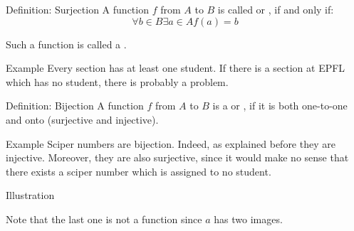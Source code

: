 \documentclass[a4paper]{article}
\begin{document}
\begin{parag}{Definition: Surjection}
    A function $f$ from $A$ to $B$ is called  or , if and only if:
    \[\forall b \in B \exists a \in A f\left(a\right) = b\]

    Such a function is called a .

    \begin{subparag}{Example}
        Every section has at least one student. If there is a section at EPFL which has no student, there is probably a problem.
    \end{subparag}
\end{parag}


\begin{parag}{Definition: Bijection}
    A function $f$ from $A$ to $B$ is a  or , if it is both one-to-one and onto (surjective and injective).

    \begin{subparag}{Example}
        Sciper numbers are bijection. Indeed, as explained before they are injective. Moreover, they are also surjective, since it would make no sense that there exists a sciper number which is assigned to no student.
    \end{subparag}
\end{parag}

\begin{parag}{Illustration}

    Note that the last one is not a function since $a$ has two images.
\end{parag}
\end{document}
